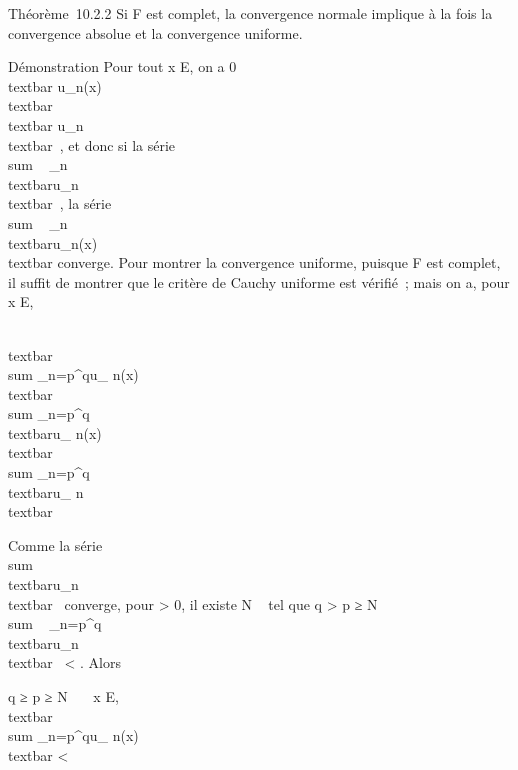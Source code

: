 \documentclass[]{article}
\begin{document}
Théorème~10.2.2 Si F est complet, la convergence normale implique à la
fois la convergence absolue et la convergence uniforme.

Démonstration Pour tout x \in E, on a 0 \leq\\textbar{}
u\_n(x)\\textbar{} \leq\\textbar{}
u\_n\\textbar{}\infty~, et donc si la série
\\sum ~
\_n\in{}~\\textbar{}u\_n\\textbar{}\infty~,
la série \\sum ~
\_n\in{}~\\textbar{}u\_n(x)\\textbar{}
converge. Pour montrer la convergence uniforme, puisque F est complet,
il suffit de montrer que le critère de Cauchy uniforme est vérifié~;
mais on a, pour x \in E,

\\textbar{}\\sum
\_n=p^qu\_ n(x)\\textbar{}
\leq\\sum
\_n=p^q\\textbar{}u\_
n(x)\\textbar{} \leq\\sum
\_n=p^q\\textbar{}u\_
n\\textbar{}\infty~

Comme la série \\sum ~
\\textbar{}u\_n\\textbar{}\infty~
converge, pour \epsilon \textgreater{} 0, il existe N \in {}~ tel que q
\textgreater{} p ≥ N
\rigtharrow~\\sum ~
\_n=p^q\\textbar{}u\_n\\textbar{}\infty~
\textless{} \epsilon. Alors

q ≥ p ≥ N \rigtharrow~\forall~~x \in E,
\\textbar{}\\sum
\_n=p^qu\_ n(x)\\textbar{}
\textless{} \epsilon
\end{document}
